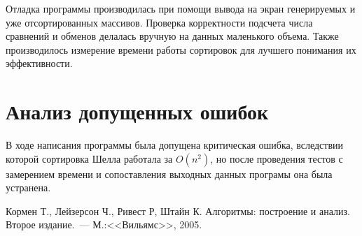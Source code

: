 \documentclass[a4paper,12pt,titlepage,finall]{article}
\begin{document}
Отладка программы производилась при помощи вывода на экран генерируемых и уже отсортированных массивов.
Проверка корректности подсчета числа сравнений и обменов делалась вручную на данных маленького объема.
Также производилось измерение времени работы сортировок для лучшего понимания их эффективности.

\newpage

\section{Анализ допущенных ошибок}

В ходе написания программы была допущена критическая ошибка, вследствии которой сортировка Шелла работала за $O(n^2)$, 
но после проведения тестов с замерением времени и сопоставления выходных данных програмы она была устранена.

\newpage
\begin{raggedright}
\begin{thebibliography}{99}
 Кормен Т., Лейзерсон Ч., Ривест Р, Штайн К. Алгоритмы: построение и анализ.
    Второе издание.~--- М.:<<Вильямс>>, 2005.
\end{thebibliography}
\end{raggedright}
\end{document}
